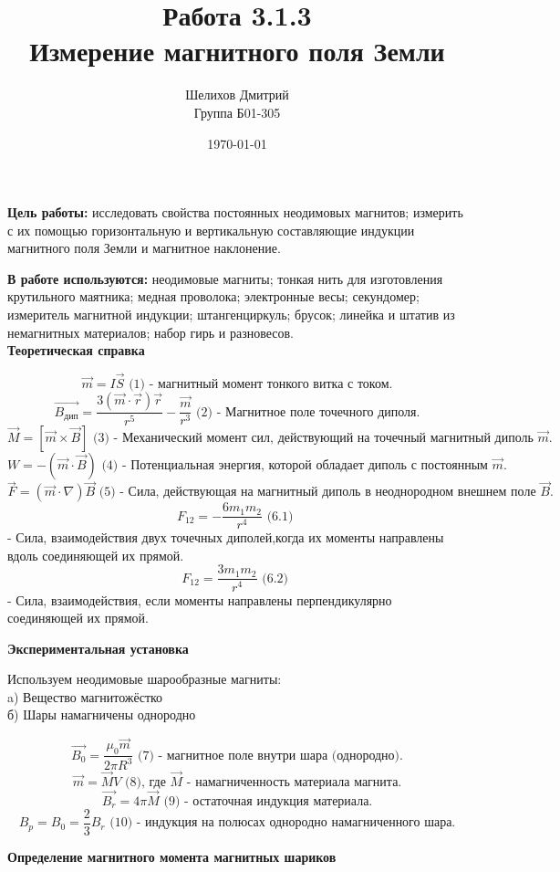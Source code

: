 \documentclass[a4paper,12pt]{article}
\author{Шелихов Дмитрий\\Группа Б01-305}
\title{\textbf{Работа 3.1.3\\Измерение магнитного поля Земли}}
\date{\today}
\begin{document}
 

\maketitle

\textbf{Цель работы:} исследовать свойства постоянных неодимовых магнитов; измерить с их помощью горизонтальную и вертикальную составляющие индукции магнитного поля Земли и магнитное наклонение.
\par
\textbf{В работе используются:} неодимовые магниты; тонкая нить для изготовления крутильного маятника; медная проволока; электронные весы; секундомер; измеритель магнитной индукции; штангенциркуль; брусок; линейка и штатив из немагнитных материалов; набор гирь и разновесов.\\
\noindent\textbf{Теоретическая справка}

$$ \vec{m} = I\vec{S} \text{ (1) - магнитный момент тонкого витка с током.} $$
$$ \vec {B_{дип}} = \frac {3(\vec {m} \cdot \vec{r})\vec{r}}{r^5} - \frac {\vec{m}}{r^3} \text{ (2) - Магнитное поле точечного диполя.} $$ 
$$ \vec{M} = [\vec{m} \times \vec{B}] \text{ (3) - Механический момент сил, действующий на точечный магнитный диполь $\vec{m}$.} $$
$$ W = -(\vec{m} \cdot \vec{B})  \text{ (4) - Потенциальная энергия, которой обладает диполь с постоянным $\vec{m}$.} $$
$$ \vec{F} = (\vec{m} \cdot \nabla)\vec{B}  \text{ (5) - Сила, действующая на магнитный диполь в неоднородном внешнем поле $\vec{B}$.} $$
$$ F_{12} = -\frac {6m_1m_2}{r^4}  \text{ (6.1) } $$ - Сила, взаимодействия двух точечных диполей,когда их моменты направлены вдоль соединяющей их прямой. 
$$ F_{12} = \frac {3m_1m_2}{r^4}  \text{ (6.2) } $$ - Сила, взаимодействия, если моменты направлены перпендикулярно соединяющей их прямой.

\noindent\textbf{Экспериментальная установка}

Используем неодимовые шарообразные магниты: \\a) Вещество магнитожёстко\\б) Шары намагничены однородно

$$ \vec {B_0} = \frac {\mu_0 \vec{m}}{2\pi R^3} \text{ (7) - магнитное поле внутри шара (однородно).} $$
$$ \vec {m} = \vec{M}V \text{ (8), где $\vec{M}$ - намагниченность материала магнита.} $$
$$ \vec {B_r} = 4\pi\vec{M}  \text{ (9) - остаточная индукция материала.} $$
$$ B_p = B_0 = \frac {2}{3}B_r  \text{ (10) - индукция на полюсах однородно намагниченного шара.} $$

\noindent\textbf{Определение магнитного момента магнитных шариков}
\end{document}
